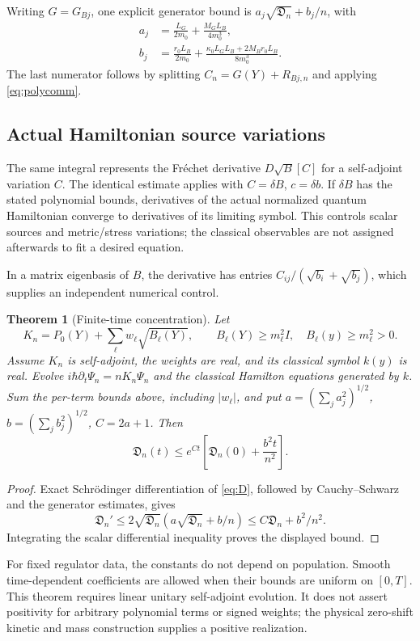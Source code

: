 \documentclass[11pt]{article}
\newtheorem{theorem}{Theorem}[section]
\begin{document}
Writing $G=G_{Bj}$, one explicit generator bound is $a_j\sqrt{\mathfrak D_n}+b_j/n$, with
\begin{align}
a_j&=\frac{L_G}{2m_0}+\frac{M_GL_B}{4m_0^3},\\
b_j&=\frac{r_0L_B}{2m_0}
+\frac{\kappa_0L_GL_B+2M_Br_0L_B}{8m_0^3}.
\end{align}
The last numerator follows by splitting $C_n=G(Y)+R_{Bj,n}$ and applying \eqref{eq:polycomm}.

\subsection{Actual Hamiltonian source variations}
The same integral represents the Fréchet derivative $D\sqrt B[C]$ for a self-adjoint variation $C$. The identical estimate applies with $C=\delta B$, $c=\delta b$. If $\delta B$ has the stated polynomial bounds, derivatives of the actual normalized quantum Hamiltonian converge to derivatives of its limiting symbol. This controls scalar sources and metric/stress variations; the classical observables are not assigned afterwards to fit a desired equation.

In a matrix eigenbasis of $B$, the derivative has entries $C_{ij}/(\sqrt{b_i}+\sqrt{b_j})$, which supplies an independent numerical control.

\begin{theorem}[Finite-time concentration]\label{thm:conc}
Let
\[
K_n=P_0(Y)+\sum_\ell w_\ell\sqrt{B_\ell(Y)},
\qquad B_\ell(Y)\ge m_\ell^2I,\quad B_\ell(y)\ge m_\ell^2>0.
\]
Assume $K_n$ is self-adjoint, the weights are real, and its classical symbol $k(y)$ is real. Evolve
$i\hbar\partial_t\Psi_n=nK_n\Psi_n$ and the classical Hamilton equations generated by $k$.
Sum the per-term bounds above, including $|w_\ell|$, and put
$a=(\sum_ja_j^2)^{1/2}$, $b=(\sum_jb_j^2)^{1/2}$, $C=2a+1$. Then
\begin{equation}\label{eq:concentration}
\boxed{\mathfrak D_n(t)\le e^{Ct}
\left[\mathfrak D_n(0)+\frac{b^2t}{n^2}\right].}
\end{equation}
\end{theorem}
\begin{proof}
Exact Schrödinger differentiation of \eqref{eq:D}, followed by Cauchy--Schwarz and the generator estimates, gives
\[
\mathfrak D_n'\le2\sqrt{\mathfrak D_n}
(a\sqrt{\mathfrak D_n}+b/n)
\le C\mathfrak D_n+b^2/n^2.
\]
Integrating the scalar differential inequality proves the displayed bound.
\end{proof}
For fixed regulator data, the constants do not depend on population. Smooth time-dependent coefficients are allowed when their bounds are uniform on $[0,T]$. This theorem requires linear unitary self-adjoint evolution. It does not assert positivity for arbitrary polynomial terms or signed weights; the physical zero-shift kinetic and mass construction supplies a positive realization.
\end{document}
